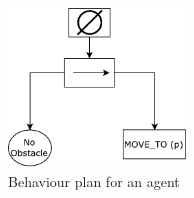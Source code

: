 \documentclass[journal]{IEEEtran}
\theoremstyle{definition}
\newcommand{\ra}{$\rightarrow$}
\newcommand{\chg}[2]{\textcolor{red}{\sout{#1}}{\ra}\textcolor{blue}{\uline{#2}}} %
\newcommand\patrizio[1]{\nb{Patrizio}{#1}}
\begin{document}
\begin{figure}[h]
\begin{center}
\includegraphics[width=1.85in]{Figures/BP2.pdf}
\caption{Behaviour plan for an agent }\label{fig:Example}
\end{center}
\end{figure}


















\end{document}
